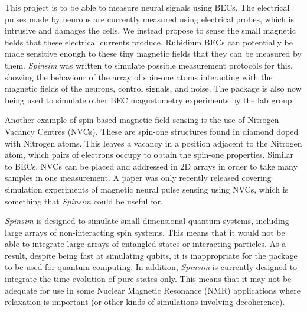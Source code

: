\documentclass{jors}
\begin{document}
		This project is to be able to measure neural signals using BECs.
		The electrical pulses made by neurons are currently measured using electrical probes, which is intrusive and damages the cells.
		We instead propose to sense the small magnetic fields that these electrical currents produce.
		Rubidium BECs can potentially be made sensitive enough to these tiny magnetic fields that they can be measured by them.
		\emph{Spinsim} was written to simulate possible measurement protocols for this, showing the behaviour of the array of spin-one atoms interacting with the magnetic fields of the neurons, control signals, and noise.
		The package is also now being used to simulate other BEC magnetometry experiments by the lab group.

		Another example of spin based magnetic field sensing is the use of Nitrogen Vacancy Centres (NVCs).
		These are spin-one structures found in diamond doped with Nitrogen atoms.
		This leaves a vacancy in a position adjacent to the Nitrogen atom, which pairs of electrons occupy to obtain the spin-one properties.
		Similar to BECs, NVCs can be placed and addressed in 2D arrays in order to take many samples in one measurement.
		A paper was only recently released covering simulation experiments of magnetic neural pulse sensing using NVCs\cite{parashar_axon_2020}, which is something that \emph{Spinsim} could be useful for.

		\emph{Spinsim} is designed to simulate small dimensional quantum systems, including large arrays of non-interacting spin systems.
		This means that it would not be able to integrate large arrays of entangled states or interacting particles.
		As a result, despite being fast at simulating qubits, it is inappropriate for the package to be used for quantum computing.
		In addition, \emph{Spinsim} is currently designed to integrate the time evolution of pure states only.
		This means that it may not be adequate for use in some Nuclear Magnetic Resonance (NMR) applications where relaxation\cite{veshtort_spinevolution_2006} is important (or other kinds of simulations involving decoherence).
\end{document}
